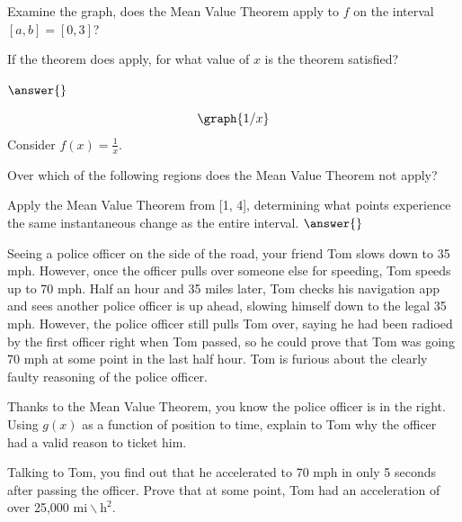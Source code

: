 \documentclass{ximera}
\begin{document}
\begin{question}
Examine the graph, does the Mean Value Theorem apply to $f$ on the interval $[a,b]=[0,3]$?

\begin{multipleChoice}
\end{multipleChoice}

If the theorem does apply, for what value of $x$ is the theorem satisfied?

$\answer{}$
\end{question}

\begin{question}
\[
\graph{1/x}
\]
Consider $f(x) = \frac{1}{x}$.

Over which of the following regions does the Mean Value Theorem not apply?

\begin{selectAll}
\choice{$[1,2]$}
\choice{$(0,4]$}
\choice[correct]{$[-1,1]$}
\choice[correct]{$[0,2]$}
\choice{$[-5,0)$}
\end{selectAll}

Apply the Mean Value Theorem from [1, 4], determining what points experience the same instantaneous change as the entire interval.
$\answer{}$
\end{question}

\begin{question}
Seeing a police officer on the side of the road, your friend Tom slows down to 35 mph. However, once the officer pulls over someone else for speeding, Tom speeds up to 70 mph. Half an hour and 35 miles later, Tom checks his navigation app and sees another police officer is up ahead, slowing himself down to the legal 35 mph. However, the police officer still pulls Tom over, saying he had been radioed by the first officer right when Tom passed, so he could prove that Tom was going 70 mph at some point in the last half hour. Tom is furious about the clearly faulty reasoning of the police officer.

Thanks to the Mean Value Theorem, you know the police officer is in the right. Using $g(x)$ as a function of position to time, explain to Tom why the officer had a valid reason to ticket him.

\begin{freeResponse}
\end{freeResponse}

Talking to Tom, you find out that he accelerated to 70 mph in only 5 seconds after passing the officer. Prove that at some point, Tom had an acceleration of over 25,000 $\text{mi} \backslash \text{h}^2$.

\begin{freeResponse}
\end{freeResponse}
\end{question}
\end{document}
